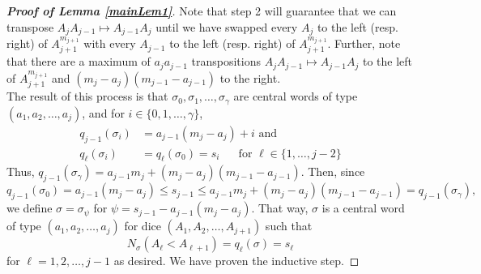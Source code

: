 \documentclass[11pt]{article}
\theoremstyle{definition}
\begin{document}
\begin{proof}[\bf{Proof of Lemma \ref{mainLem1}}]
    Note that step 2 will guarantee that we can transpose $A_jA_{j-1} \mapsto A_{j-1}A_j$ until we have swapped every $A_{j}$ to the left (resp. right) of $A_{j+1}^{m_{j+1}}$ with every $A_{j-1}$ to the left (resp. right) of $A_{j+1}^{m_{j+1}}$. Further, note that there are a maximum of $a_ja_{j-1}$ transpositions $A_jA_{j-1} \mapsto A_{j-1}A_j$ to the left of $A_{j+1}^{m_{j+1}}$ and $(m_j-a_j)(m_{j-1}-a_{j-1})$ to the right.
    \\[5mm] The result of this process is that $\sigma_0,\sigma_1,\dots,\sigma_\gamma$ are central words of type $(a_1,a_2,\dots,a_j)$, and for $i \in  \{0,1,\dots,\gamma\}$,
    \begin{align*}
        q_{j-1}(\sigma_i) &= a_{j-1}(m_j-a_j) + i \text{ and} \\
        q_{\ell}(\sigma_i) &= q_\ell(\sigma_0) = s_i \:\:\:\:\:\: \text{ for } \ell \in \{1,\dots, j-2 \}
    \end{align*}
    Thus, $q_{j-1}(\sigma_\gamma) = a_{j-1}m_j+(m_j-a_j)(m_{j-1}-a_{j-1})$. Then, since
    $$q_{j-1}(\sigma_0) = a_{j-1}(m_j-a_j) \leq s_{j-1} \leq a_{j-1}m_j+(m_j-a_j)(m_{j-1}-a_{j-1}) = q_{j-1}(\sigma_\gamma),$$
    we define $\sigma = \sigma_{\psi}$ for $\psi = s_{j-1} - a_{j-1}(m_j-a_j)$. That way, $\sigma$ is a central word of type $(a_1,a_2,\dots,a_{j})$ for dice $(A_1,A_2,\dots,A_{j+1})$ such that
    $$N_{\sigma}(A_\ell < A_{\ell+1}) = q_{\ell}(\sigma) = s_{\ell}$$
    for $\ell = 1,2,\dots,j-1$ as desired. We have proven the inductive step.
\end{proof}
\end{document}
